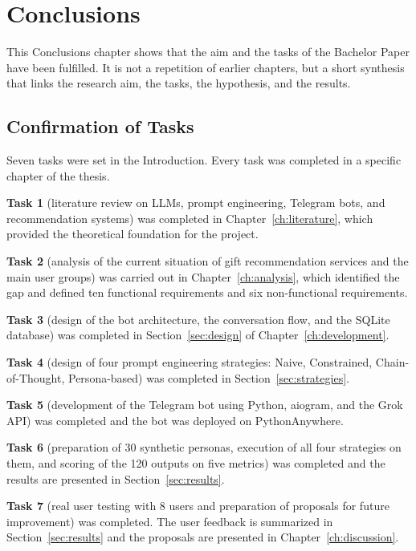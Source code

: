\chapter*{Conclusions}
\label{ch:conclusions}

This Conclusions chapter shows that the aim and the tasks of the Bachelor Paper have been fulfilled. It is not a repetition of earlier chapters, but a short synthesis that links the research aim, the tasks, the hypothesis, and the results.

\section*{Confirmation of Tasks}

Seven tasks were set in the Introduction. Every task was completed in a specific chapter of the thesis.

\textbf{Task 1} (literature review on LLMs, prompt engineering, Telegram bots, and recommendation systems) was completed in Chapter~\ref{ch:literature}, which provided the theoretical foundation for the project.

\textbf{Task 2} (analysis of the current situation of gift recommendation services and the main user groups) was carried out in Chapter~\ref{ch:analysis}, which identified the gap and defined ten functional requirements and six non-functional requirements.

\textbf{Task 3} (design of the bot architecture, the conversation flow, and the SQLite database) was completed in Section~\ref{sec:design} of Chapter~\ref{ch:development}.

\textbf{Task 4} (design of four prompt engineering strategies: Naive, Constrained, Chain-of-Thought, Persona-based) was completed in Section~\ref{sec:strategies}.

\textbf{Task 5} (development of the Telegram bot using Python, aiogram, and the Grok API) was completed and the bot was deployed on PythonAnywhere.

\textbf{Task 6} (preparation of 30 synthetic personas, execution of all four strategies on them, and scoring of the 120 outputs on five metrics) was completed and the results are presented in Section~\ref{sec:results}.

\textbf{Task 7} (real user testing with 8 users and preparation of proposals for future improvement) was completed. The user feedback is summarized in Section~\ref{sec:results} and the proposals are presented in Chapter~\ref{ch:discussion}.

